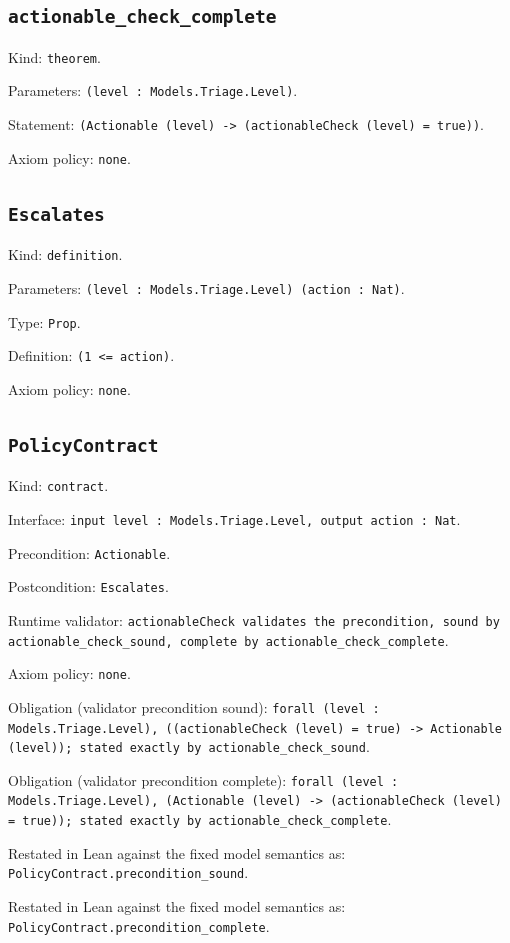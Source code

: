 \documentclass[11pt]{article}
\begin{document}
\subsection*{\texttt{actionable\_check\_complete}}
\noindent Kind: \texttt{theorem}.\par
\noindent Parameters: \texttt{(level : Models.Triage.Level)}.\par
\noindent Statement: \texttt{(Actionable (level) -> (actionableCheck (level) = true))}.\par
\noindent Axiom policy: \texttt{none}.\par
\subsection*{\texttt{Escalates}}
\noindent Kind: \texttt{definition}.\par
\noindent Parameters: \texttt{(level : Models.Triage.Level) (action : Nat)}.\par
\noindent Type: \texttt{Prop}.\par
\noindent Definition: \texttt{(1 <= action)}.\par
\noindent Axiom policy: \texttt{none}.\par
\subsection*{\texttt{PolicyContract}}
\noindent Kind: \texttt{contract}.\par
\noindent Interface: \texttt{input level : Models.Triage.Level, output action : Nat}.\par
\noindent Precondition: \texttt{Actionable}.\par
\noindent Postcondition: \texttt{Escalates}.\par
\noindent Runtime validator: \texttt{actionableCheck validates the precondition, sound by actionable\_check\_sound, complete by actionable\_check\_complete}.\par
\noindent Axiom policy: \texttt{none}.\par
\noindent Obligation (validator precondition sound): \texttt{forall (level : Models.Triage.Level), ((actionableCheck (level) = true) -> Actionable (level)); stated exactly by actionable\_check\_sound}.\par
\noindent Obligation (validator precondition complete): \texttt{forall (level : Models.Triage.Level), (Actionable (level) -> (actionableCheck (level) = true)); stated exactly by actionable\_check\_complete}.\par
\noindent Restated in Lean against the fixed model semantics as: \texttt{PolicyContract.precondition\_sound}.\par
\noindent Restated in Lean against the fixed model semantics as: \texttt{PolicyContract.precondition\_complete}.\par
\end{document}

